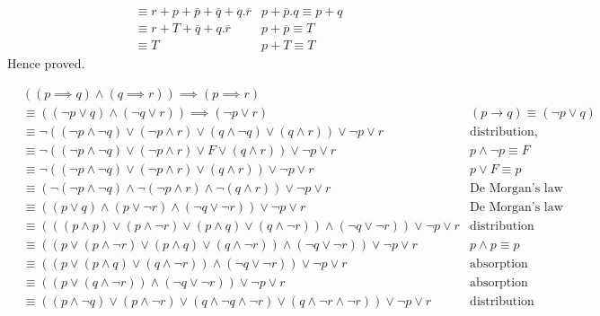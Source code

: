 \documentclass[addpoints]{exam}
\newcommand\ol\overline
\begin{document}
\begin{questions}
\begin{parts}
\begin{solution}
\begin{align*}
        & \equiv r + p  + \ol{p} + \ol{q} + q.\ol{r} & p+\ol{p}.q\equiv p+q\\
        & \equiv r + T + \ol{q} + q.\ol{r} & p + \ol{p}\equiv T\\
        & \equiv T & p+T\equiv T
      \end{align*}
      Hence proved.
    \end{solution}
    \begin{solution}
      \begin{align*}
        & ((p \implies q) \land (q \implies r)) \implies (p \implies r)\\
        & \equiv ((\lnot p \lor  q) \land (\lnot q \lor  r)) \implies (\lnot p \lor   r) & (p\rightarrow q) \equiv (\lnot p\lor q)\\
        & \equiv \lnot ((\lnot p\land \lnot q) \lor  (\lnot p\land r) \lor  (q\land \lnot q) \lor  (q\land r)) \lor  \lnot p \lor   r & \text{distribution, implication}\\
        & \equiv \lnot ((\lnot p\land \lnot q) \lor  (\lnot p\land r) \lor  F \lor  (q\land r)) \lor  \lnot p \lor r & p\land \lnot p \equiv F\\
        & \equiv \lnot((\lnot p\land \lnot q) \lor  (\lnot p\land r) \lor  (q\land r)) \lor  \lnot p \lor   r & p \lor  F \equiv p\\
        & \equiv (\lnot(\lnot p\land \lnot q)\land \lnot( \lnot p\land r)\land \lnot(q\land r)) \lor  \lnot p \lor   r & \text{De Morgan's law}\\
        & \equiv ((p\lor q)\land (p\lor \lnot r)\land (\lnot q \lor  \lnot r)) \lor  \lnot p \lor r & \text{De Morgan's law}\\
        & \equiv (((p\land p) \lor  (p\land \lnot r) \lor (p\land q) \lor  (q\land \lnot r))\land (\lnot q \lor  \lnot r)) \lor  \lnot p \lor   r & \text{distribution}\\
        & \equiv ((p \lor  (p\land \lnot r) \lor (p\land q) \lor  (q\land \lnot r))\land (\lnot q \lor  \lnot r)) \lor  \lnot p \lor   r & p\land p\equiv p\\
        & \equiv ((p \lor (p\land q) \lor  (q\land\lnot r))\land (\lnot q \lor  \lnot r)) \lor  \lnot p \lor   r & \text{absorption}\\
        & \equiv ((p \lor  (q\land \lnot r))\land (\lnot q \lor  \lnot r)) \lor  \lnot p \lor   r & \text{absorption}\\
        & \equiv ((p\land \lnot q) \lor  (p\land \lnot r) \lor  (q\land \lnot q\land \lnot r)  \lor  (q\land \lnot r\land \lnot r)) \lor  \lnot p \lor   r & \text{distribution}\\

\end{align*}
\end{solution}
\end{parts}
\end{questions}
\end{document}
